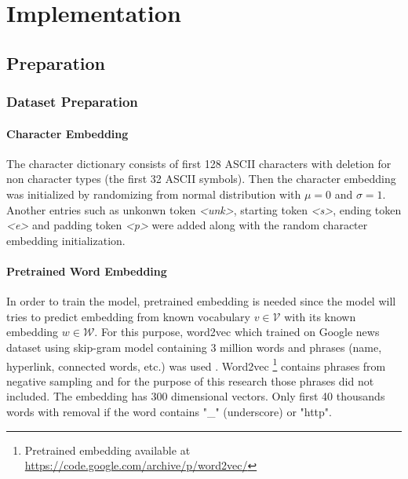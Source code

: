 \chapter{Implementation}
\label{chap:implementation}

\section{Preparation}
    \subsection{Dataset Preparation}
        \subsubsection{Character Embedding}
            The character dictionary consists of first 128 ASCII
            characters with deletion for non character types (the
            first 32 ASCII symbols). Then the character embedding was
            initialized by randomizing from normal distribution with
            $\mu = 0$ and $\sigma = 1$. Another entries such as
            unkonwn token \textit{\textless unk\textgreater}, starting
            token \textit{\textless s\textgreater}, ending token
            \textit{\textless e\textgreater} and padding token
            \textit{\textless p\textgreater} were added along with the
            random character embedding initialization.

        \subsubsection{Pretrained Word Embedding}
            In order to train the model, pretrained embedding is
            needed since the model will tries to predict embedding
            from known vocabulary $v \in \mathcal{V}$ with its known
            embedding $w \in \mathcal{W}$. For this purpose, word2vec
            which trained on Google news dataset using skip-gram model
            containing 3 million words and phrases (name, hyperlink,
            connected words, etc.) was used
            \citep{Distributed2013mikolov}. Word2vec
            \footnote{Pretrained embedding available at 
            \url{https://code.google.com/archive/p/word2vec/}}
            contains phrases from negative sampling and for the purpose of
            this research those phrases did not included. The embedding
            has 300 dimensional vectors. Only first 40 thousands words with
            removal if the word contains "\_" (underscore) or "http".
            
